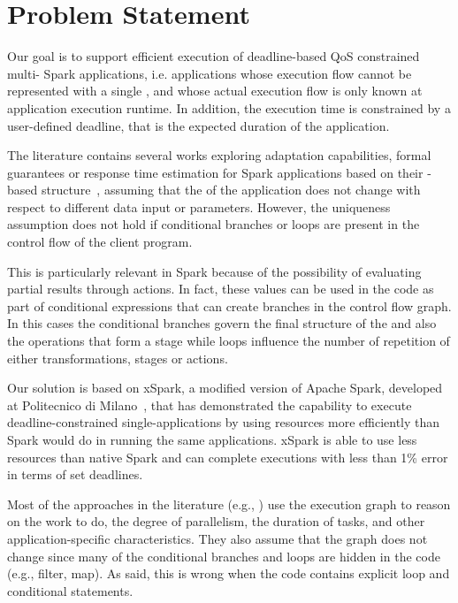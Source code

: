 \section{Problem Statement}\label{sec:problem_statement}
Our goal is to support efficient execution of deadline-based QoS constrained multi-{\plan} Spark applications, i.e. applications whose execution flow cannot be represented with a single \plan, and whose actual execution flow is only known at application execution runtime. In addition, the execution time is constrained by a user-defined deadline, that is the expected duration of the application.

The literature contains several works exploring adaptation capabilities, formal guarantees or response time estimation for Spark applications based on their \plan-based structure~\cite{dSpark, xsparkreport, Quattrocchi2018}, assuming that the \plan of the application does not change with respect to different data input or parameters. However, the \plan uniqueness assumption does not hold if conditional branches or loops are present in the control flow of the client program.

This is particularly relevant in Spark because of the possibility of evaluating
partial results through actions. In fact, these values can be used in the code as part of conditional expressions that can create branches in the control flow graph. In this cases the conditional branches govern the final structure of the \plan and also the operations that form a stage while loops influence the number of repetition of either transformations, stages or actions. 

Our solution is based on xSpark, a modified version of Apache Spark, developed at Politecnico di Milano~\cite{xsparkreport, Quattrocchi2018}, that has demonstrated the capability to execute deadline-constrained single-\plan applications by using resources more efficiently than  Spark would do in running the same applications. xSpark is able to use less resources than native Spark and can complete executions with less than 1\% error in terms of set deadlines.

Most of the approaches in the literature (e.g., \cite{gibilisco2016stage,Sidhanta2016, dSpark, nfm}) use the execution graph to reason on the work to do, the degree of parallelism, the duration of tasks, and other application-specific characteristics. They also assume that the graph does not change since many of the conditional  branches and loops are hidden in the code (e.g., filter, map). As said, this is wrong when the code contains explicit loop and conditional statements.

